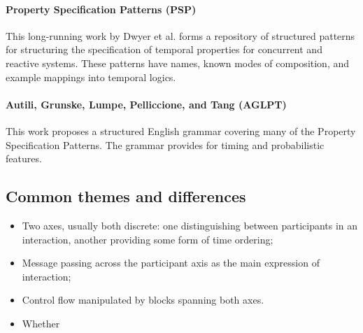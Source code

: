 \paragraph{Property Specification Patterns (PSP)}

This long-running work by Dwyer et al. forms a repository of
structured patterns for structuring the specification of temporal
properties for concurrent and reactive systems.  These patterns have names,
known modes of composition, and example mappings into temporal logics.

\paragraph{Autili, Grunske, Lumpe, Pelliccione, and Tang (AGLPT)}

This work proposes a structured English grammar covering many of the Property
Specification Patterns.  The grammar provides for timing and probabilistic
features.

\subsection{Common themes and differences}

\begin{itemize}
\item
	Two axes, usually both discrete:
	one distinguishing between participants in an interaction, another
	providing some form of time ordering;
\item
	Message passing across the participant axis as the main expression of
	interaction;
\item
	Control flow manipulated by blocks 
	spanning both axes.
\end{itemize}

\begin{itemize}
\item
	Whether 
\end{itemize}

